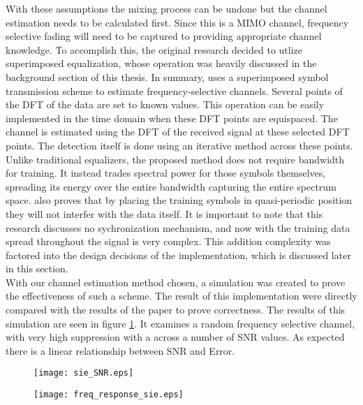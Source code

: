 With these assumptions the mixing process can be undone but the channel estimation needs to be calculated first.  Since this is a MIMO channel, frequency selective fading will need to be captured to providing appropriate channel knowledge.  To accomplish this, the original research decided to utlize superimposed equalization, whose operation was heavily discussed in the background section of this thesis.  In summary, \cite{Ghogho} uses a superimposed symbol transmission scheme to estimate frequency-selective channels. Several points of the DFT of the data are set to known values. This operation can be easily implemented in the time domain when these DFT points are equispaced. The channel is estimated using the DFT of the received signal at these selected DFT points. The detection itself is done using an iterative method across these points.  Unlike traditional equalizers, the proposed method does not require bandwidth for training.  It instead trades spectral power for those symbols themselves, spreading its energy over the entire bandwidth capturing the entire spectrum space.   \cite{Ghogho} also proves that by placing the training symbols in quasi-periodic position they will not interfer with the data itself.  It is important to note that this research discusses no sychronization mechanism, and now with the training data spread throughout the signal is very complex.  This addition complexity was factored into the design decisions of the implementation, which is discussed later in this section.\\

With our channel estimation method chosen, a simulation was created to prove the effectiveness of such a scheme.  The result of this implementation were directly compared with the results of the paper to prove correctness.%
The results of this simulation are seen in figure \ref{sie}.  It examines a random frequency selective channel, with very high suppression with a across a number of SNR values.  As expected there is a linear relationship between SNR and Error.\\  %

\begin{figure}\label{sie}
\texttt{[image: sie\_SNR.eps]}
\end{figure}

\begin{figure}\label{sie_freq}
\texttt{[image: freq\_response\_sie.eps]}
\end{figure}


